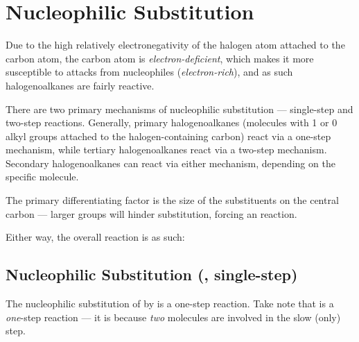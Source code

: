 	\pagebreak
	\hypertarget{AppendixNucleophilicSubstitution}{}
	\section{Nucleophilic Substitution}

		Due to the high relatively electronegativity of the halogen atom attached to the carbon atom, the carbon atom is
		\textit{electron-deficient}, which makes it more susceptible to attacks from nucleophiles (\textit{electron-rich}), and
		as such halogenoalkanes are fairly reactive.

		There are two primary mechanisms of nucleophilic substitution --- single-step and two-step reactions. Generally, primary
		halogenoalkanes (molecules with 1 or 0 alkyl groups attached to the halogen-containing carbon) react via a one-step
		mechanism, while tertiary halogenoalkanes react via a two-step mechanism. Secondary halogenoalkanes can react via either
		mechanism, depending on the specific molecule.

		The primary differentiating factor is the size of the substituents on the central carbon --- larger groups will hinder
		\sntwo{} substitution, forcing an \snone{} reaction.

		Either way, the overall reaction is as such:


		\pagebreak
		\subsection{Nucleophilic Substitution (\sntwo{}, single-step)}

			The nucleophilic substitution of  by  is a one-step reaction. Take note that \sntwo{} is a
			\textit{one}-step reaction --- it is \sntwo{} because \textit{two} molecules are involved in the slow (only) step.

